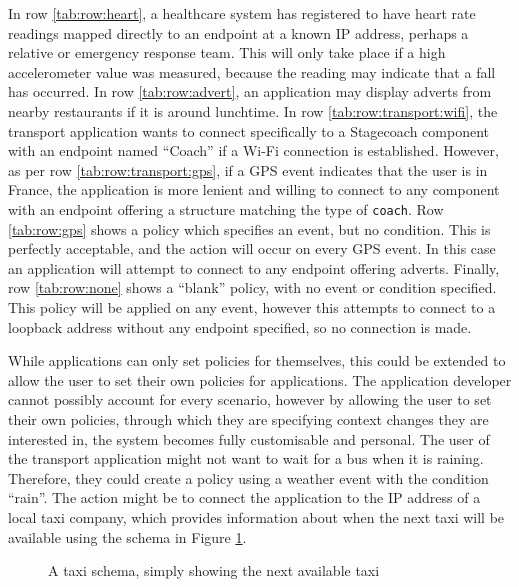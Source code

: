 \documentclass[12pt,twoside,notitlepage]{report}
\begin{document}
In row \ref{tab:row:heart}, a healthcare system has registered to have heart rate readings mapped directly to an endpoint at a known IP address, perhaps a relative or emergency response team. 
This will only take place if a high accelerometer value was measured, because the reading may indicate that a fall has occurred.  
In row \ref{tab:row:advert}, an application may display adverts from nearby restaurants if it is around lunchtime. 
In row \ref{tab:row:transport:wifi}, the transport application wants to connect specifically to a Stagecoach component with an endpoint named ``Coach'' if a Wi-Fi connection is established. 
However, as per row \ref{tab:row:transport:gps}, if a GPS event indicates that the user is in France, the application is more lenient and willing to connect to any component with an endpoint offering a structure matching the type of {\tt coach}. 
Row \ref{tab:row:gps} shows a policy which specifies an event, but no condition. 
This is perfectly acceptable, and the action will occur on every GPS event. 
In this case an application will attempt to connect to any endpoint offering adverts. 
Finally, row \ref{tab:row:none} shows a ``blank'' policy, with no event or condition specified.  
This policy will be applied on any event, however this attempts to connect to a loopback address without any endpoint specified, so no connection is made. 

While applications can only set policies for themselves, this could be extended to allow the user to set their own policies for applications. 
The application developer cannot possibly account for every scenario, however by allowing the user to set their own policies, through which they are specifying context changes they are interested in, the system becomes fully customisable and personal. 
The user of the transport application might not want to wait for a bus when it is raining. 
Therefore, they could create a policy using a weather event with the condition ``rain''. 
The action might be to connect the application to the IP address of a local taxi company, which provides information about when the next taxi will be available using the schema in Figure \ref{fig:taxi-schema-eval}.

\begin{figure}[h]

\caption[Example Schema for a Taxi]{A taxi schema, simply showing the next available taxi}
\label{fig:taxi-schema-eval}
\end{figure}

\end{document}
